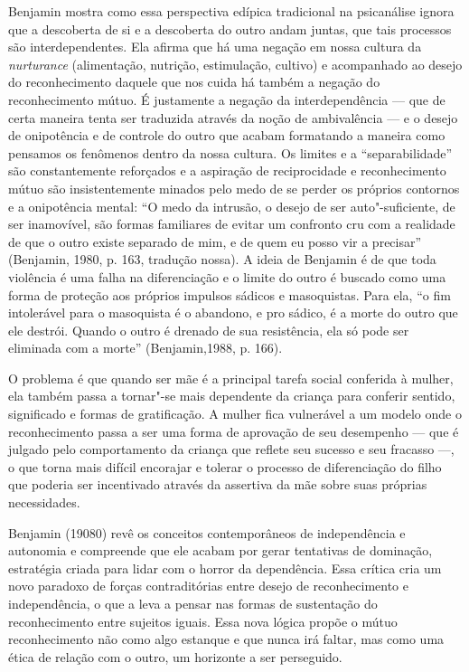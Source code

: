 Benjamin mostra como essa perspectiva edípica tradicional na psicanálise
ignora que a descoberta de si e a descoberta do outro andam juntas, que
tais processos são interdependentes. Ela afirma que há uma negação em
nossa cultura da \emph{nurturance} (alimentação, nutrição, estimulação,
cultivo) e acompanhado ao desejo do reconhecimento daquele que nos cuida
há também a negação do reconhecimento mútuo. É justamente a negação da
interdependência --- que de certa maneira tenta ser traduzida através da
noção de ambivalência --- e o desejo de onipotência e de controle do
outro que acabam formatando a maneira como pensamos os fenômenos dentro
da nossa cultura. Os limites e a ``separabilidade'' são constantemente
reforçados e a aspiração de reciprocidade e reconhecimento mútuo são
insistentemente minados pelo medo de se perder os próprios contornos e a
onipotência mental: ``O medo da intrusão, o desejo de ser
auto"-suficiente, de ser inamovível, são formas familiares de evitar um
confronto cru com a realidade de que o outro existe separado de mim, e
de quem eu posso vir a precisar'' (Benjamin, 1980, p. 163, tradução
nossa). A ideia de Benjamin é de que toda violência é uma falha na
diferenciação e o limite do outro é buscado como uma forma de proteção
aos próprios impulsos sádicos e masoquistas. Para ela, ``o fim
intolerável para o masoquista é o abandono, e pro sádico, é a morte do
outro que ele destrói. Quando o outro é drenado de sua resistência, ela
só pode ser eliminada com a morte'' (Benjamin,1988, p. 166).

O problema é que quando ser mãe é a principal tarefa social conferida à
mulher, ela também passa a tornar"-se mais dependente da criança para
conferir sentido, significado e formas de gratificação. A mulher fica
vulnerável a um modelo onde o reconhecimento passa a ser uma forma de
aprovação de seu desempenho --- que é julgado pelo comportamento da
criança que reflete seu sucesso e seu fracasso ---, o que torna mais
difícil encorajar e tolerar o processo de diferenciação do filho que
poderia ser incentivado através da assertiva da mãe sobre suas próprias
necessidades.

Benjamin (19080) revê os conceitos contemporâneos de independência e
autonomia e compreende que ele acabam por gerar tentativas de dominação,
estratégia criada para lidar com o horror da dependência. Essa crítica
cria um novo paradoxo de forças contraditórias entre desejo de
reconhecimento e independência, o que a leva a pensar nas formas de
sustentação do reconhecimento entre sujeitos iguais. Essa nova lógica
propõe o mútuo reconhecimento não como algo estanque e que nunca irá
faltar, mas como uma ética de relação com o outro, um horizonte a ser
perseguido.

